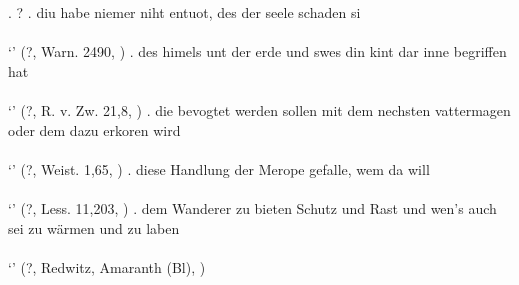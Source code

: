\ex. ?
\ag. diu habe niemer niht entuot, des der seele schaden si\\
 \\
 `' \hfill (?, Warn. 2490, \citealt[761]{behaghel1923})
\bg. des himels unt der erde und swes din kint dar inne begriffen hat\\
 \\
 `' \hfill (?, R. v. Zw. 21,8, \citealt[761]{behaghel1923})
\bg. die bevogtet werden sollen mit dem nechsten vattermagen oder dem dazu erkoren wird\\
 \\
 `' \hfill (?, Weist. 1,65, \citealt[761]{behaghel1923})
\bg. diese Handlung der Merope gefalle, wem da will\\
 \\
 `' \hfill (?, Less. 11,203, \citealt[761]{behaghel1923})
\bg. dem Wanderer zu bieten Schutz und Rast und wen's auch sei zu wärmen und zu laben\\
 \\
 `' \hfill (?, Redwitz, Amaranth (Bl), \citealt[761]{behaghel1923})

\phantom{x}
